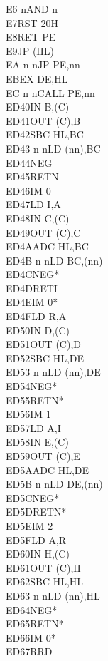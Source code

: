 \documentclass[oneside,a4paper]{book}
\begin{document}
\begin{multicols}{3}
{\begin{tabbing}
E6 n\>AND n\\
E7\>RST 20H\\
E8\>RET PE\\
E9\>JP (HL)\\
EA n n\>JP PE,nn\\
EB\>EX DE,HL\\
EC n n\>CALL PE,nn\\
ED40\>IN B,(C)\\
ED41\>OUT (C),B\\
ED42\>SBC HL,BC\\
ED43 n n\>LD (nn),BC\\
ED44\>NEG\\
ED45\>RETN\\
ED46\>IM 0\\
ED47\>LD I,A\\
ED48\>IN C,(C)\\
ED49\>OUT (C),C\\
ED4A\>ADC HL,BC\\
ED4B n n\>LD BC,(nn)\\
ED4C\>NEG*\\
ED4D\>RETI\\
ED4E\>IM 0*\\
ED4F\>LD R,A\\
ED50\>IN D,(C)\\
ED51\>OUT (C),D\\
ED52\>SBC HL,DE\\
ED53 n n\>LD (nn),DE\\
ED54\>NEG*\\
ED55\>RETN*\\
ED56\>IM 1\\
ED57\>LD A,I\\
ED58\>IN E,(C)\\
ED59\>OUT (C),E\\
ED5A\>ADC HL,DE\\
ED5B n n\>LD DE,(nn)\\
ED5C\>NEG*\\
ED5D\>RETN*\\
ED5E\>IM 2\\
ED5F\>LD A,R\\
ED60\>IN H,(C)\\
ED61\>OUT (C),H\\
ED62\>SBC HL,HL\\
ED63 n n\>LD (nn),HL\\
ED64\>NEG*\\
ED65\>RETN*\\
ED66\>IM 0*\\
ED67\>RRD\\

\end{tabbing}}
\end{multicols}
\end{document}
